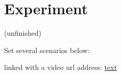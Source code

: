 \chapter{Experiment}
\label{Ch-6:Sec:Experiment}
(unfinished)

Set several scenarios below:

linked with a video url address: \href{URL}{text}
